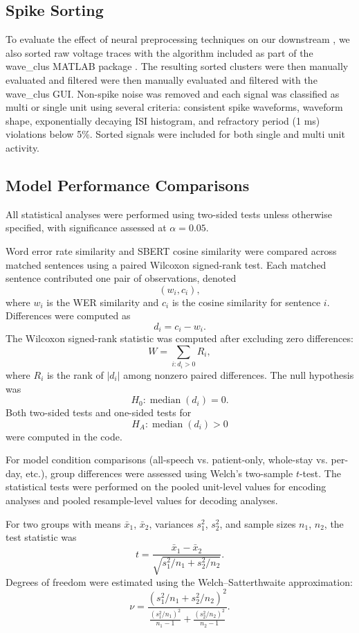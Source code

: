 \documentclass[pdflatex,sn-basic]{sn-jnl}%
\theoremstyle{thmstyleone}%
\theoremstyle{thmstyletwo}%
\theoremstyle{thmstylethree}%
\begin{document}
\subsection{Spike Sorting}\label{subsec16}
To evaluate the effect of neural preprocessing techniques on our downstream , we also sorted raw voltage traces with the algorithm included as part of the wave\_clus MATLAB package \citep{bib87}. The resulting sorted clusters were then manually evaluated and filtered were then manually evaluated and filtered with the wave\_clus GUI. Non-spike noise was removed and each signal was classified as multi or single unit using several criteria: consistent spike waveforms, waveform shape, exponentially decaying ISI histogram, and refractory period (1 ms) violations below 5\%. Sorted signals were included for both single and multi unit activity.

\subsection{Model Performance Comparisons}\label{subsec17}
All statistical analyses were performed using two-sided tests unless otherwise specified, with significance assessed at $\alpha = 0.05$.

Word error rate similarity and SBERT cosine similarity were compared across matched sentences using a paired Wilcoxon signed-rank test. Each matched sentence contributed one pair of observations, denoted
\[
(w_i, c_i),
\]
where $w_i$ is the WER similarity and $c_i$ is the cosine similarity for sentence $i$. Differences were computed as
\[
d_i = c_i - w_i.
\]
The Wilcoxon signed-rank statistic was computed after excluding zero differences:
\[
W = \sum_{i: d_i > 0} R_i,
\]
where $R_i$ is the rank of $|d_i|$ among nonzero paired differences. The null hypothesis was
\[
H_0: \operatorname{median}(d_i) = 0.
\]
Both two-sided tests and one-sided tests for
\[
H_A: \operatorname{median}(d_i) > 0
\]
were computed in the code.

For model condition comparisons (all-speech vs. patient-only, whole-stay vs. per-day, etc.), group differences were assessed using Welch's two-sample $t$-test. The statistical tests were performed on the pooled unit-level values for encoding analyses and pooled resample-level values for decoding analyses.

For two groups with means $\bar{x}_1$, $\bar{x}_2$, variances $s_1^2$, $s_2^2$, and sample sizes $n_1$, $n_2$, the test statistic was
\[
t =
\frac{\bar{x}_1 - \bar{x}_2}
{\sqrt{s_1^2/n_1 + s_2^2/n_2}}.
\]
Degrees of freedom were estimated using the Welch--Satterthwaite approximation:
\[
\nu =
\frac{
\left(s_1^2/n_1 + s_2^2/n_2\right)^2
}
{
\frac{(s_1^2/n_1)^2}{n_1 - 1}
+
\frac{(s_2^2/n_2)^2}{n_2 - 1}
}.
\]
\end{document}
